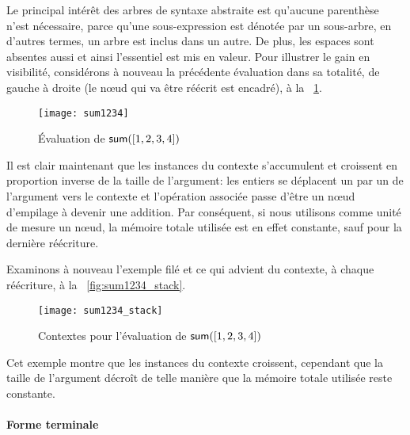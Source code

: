 Le principal intérêt des arbres de syntaxe abstraite est qu'aucune
parenthèse n'est nécessaire, parce qu'une sous-expression est dénotée
par un sous-arbre, en d'autres termes, un arbre est inclus dans un
autre. De plus, les espaces sont absentes aussi et ainsi l'essentiel
est mis en valeur. Pour illustrer le gain en visibilité, considérons à
nouveau la précédente évaluation dans sa totalité, de gauche à droite
(le n{\oe}ud qui va être réécrit est encadré), à la
\fig~\ref{fig:sum1234}.
\begin{figure}
\centering
\texttt{[image: sum1234]}
\caption{Évaluation de \(\textsf{sum}([1,2,3,4])\)\label{fig:sum1234}}
\end{figure}
Il est clair maintenant que les instances du contexte s'accumulent et
croissent en proportion inverse de la taille de l'argument: les
entiers se déplacent un par un de l'argument vers le contexte et
l'opération associée passe d'être un n{\oe}ud
d'empilage à devenir une addition. Par
conséquent, si nous utilisons comme unité de mesure un n{\oe}ud, la
mémoire totale utilisée est en effet constante, sauf pour la dernière
réécriture.

Examinons à nouveau l'exemple filé et ce qui advient du contexte, à
chaque réécriture, à la \fig~\vref{fig:sum1234_stack}.
\begin{figure}
\centering
\texttt{[image: sum1234\_stack]}
\caption{Contextes pour l'évaluation de \(\textsf{sum}([1,2,3,4])\)
\label{fig:sum1234_stack}}
\end{figure}
Cet exemple montre que les instances du contexte croissent, cependant
que la taille de l'argument décroît de telle manière que la mémoire
totale utilisée reste constante.



\paragraph{Forme terminale}
\label{sec:tail}

